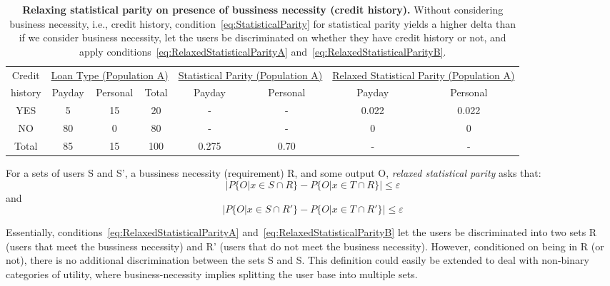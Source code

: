 \begin{table*}[t]
{ \small
  \center
  \renewcommand{\arraystretch}{1.5}
  \begin{tabular}{ c | c c c | c c | c c}
    Credit
    & \multicolumn{3}{|c|}{\underline{Loan Type (Population A)}}
    & \multicolumn{2}{|c}{\underline{Statistical Parity (Population A) }}
    & \multicolumn{2}{|c}{\underline{Relaxed Statistical Parity (Population A) }} \\
    history & Payday & Personal & Total & Payday & Personal & Payday & Personal \\
    \hline
    YES & 5  & 15 & 20 & - & - &  0.022 & 0.022 \\
    NO  & 80 & 0  & 80 & - & - &  0    & 0 \\
    \hline
    Total & 85 & 15 & 100 & 0.275 & 0.70 & - & - \\
  \end{tabular}
  \caption{{\bf Relaxing statistical parity on presence of bussiness necessity (credit history).}
    Without considering business necessity, i.e., credit history,
    condition~\ref{eq:StatisticalParity} for statistical parity yields a higher delta than if we
    consider business necessity, let the users be discriminated on whether they have credit
    history or not, and apply conditions~\ref{eq:RelaxedStatisticalParityA}
    and~\ref{eq:RelaxedStatisticalParityB}.
  }
  \label{tab:BusinessNessecityB}
}
\end{table*}
For a sets of users S and S', a bussiness necessity (requirement) R, and some
output O, {\em relaxed statistical parity} asks that:
\begin{equation}
|P\{O | x \in S \cap R\} - P\{O | x \in T \cap R\}| \le \varepsilon
\label{eq:RelaxedStatisticalParityA}
\end{equation}
and
\begin{equation}
|P\{O | x \in S \cap R'\} - P\{O | x \in T \cap R'\}| \le \varepsilon
\label{eq:RelaxedStatisticalParityB}
\end{equation}

Essentially, conditions~\ref{eq:RelaxedStatisticalParityA}
and~\ref{eq:RelaxedStatisticalParityB} let the users be discriminated into two
sets R (users that meet the bussiness necessity) and R' (users that do not
meet the business necessity). However, conditioned on being in R (or not),
there is no additional discrimination between the sets S and S. This definition
could easily be extended to deal with non-binary categories of utility, where
business-necessity implies splitting the user base into multiple sets.

